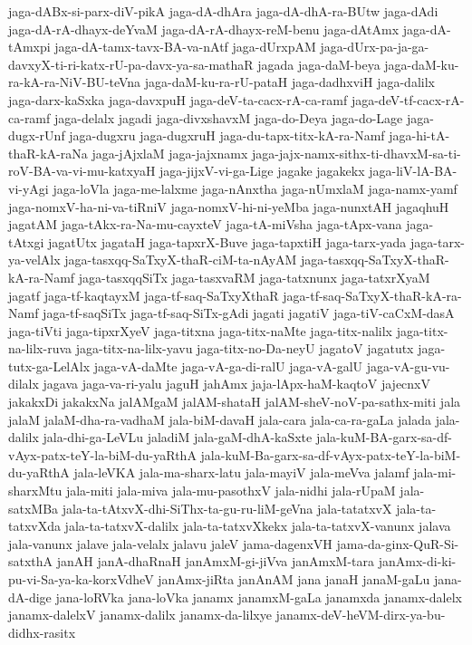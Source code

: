 {jaga-dABx-si-parx-diV-pikA
jaga-dA-dhAra
jaga-dA-dhA-ra-BUtw
jaga-dAdi
jaga-dA-rA-dhayx-deYvaM
jaga-dA-rA-dhayx-reM-benu
jaga-dAtAmx
jaga-dA-tAmxpi
jaga-dA-tamx-tavx-BA-va-nAtf
jaga-dUrxpAM
jaga-dUrx-pa-ja-ga-davxyX-ti-ri-katx-rU-pa-davx-ya-sa-mathaR
jagada
jaga-daM-beya
jaga-daM-ku-ra-kA-ra-NiV-BU-teVna
jaga-daM-ku-ra-rU-pataH
jaga-dadhxviH
jaga-dalilx
jaga-darx-kaSxka
jaga-davxpuH
jaga-deV-ta-cacx-rA-ca-ramf
jaga-deV-tf-cacx-rA-ca-ramf
jaga-delalx
jagadi
jaga-divxshavxM
jaga-do-Deya
jaga-do-Lage
jaga-dugx-rUnf
jaga-dugxru
jaga-dugxruH
jaga-du-tapx-titx-kA-ra-Namf
jaga-hi-tA-thaR-kA-raNa
jaga-jAjxlaM
jaga-jajxnamx
jaga-jajx-namx-sithx-ti-dhavxM-sa-ti-roV-BA-va-vi-mu-katxyaH
jaga-jijxV-vi-ga-Lige
jagake
jagakekx
jaga-liV-lA-BA-vi-yAgi
jaga-loVla
jaga-me-lalxme
jaga-nAnxtha
jaga-nUmxlaM
jaga-namx-yamf
jaga-nomxV-ha-ni-va-tiRniV
jaga-nomxV-hi-ni-yeMba
jaga-nunxtAH
jagaqhuH
jagatAM
jaga-tAkx-ra-Na-mu-cayxteV
jaga-tA-miVsha
jaga-tApx-vana
jaga-tAtxgi
jagatUtx
jagataH
jaga-tapxrX-Buve
jaga-tapxtiH
jaga-tarx-yada
jaga-tarx-ya-velAlx
jaga-tasxqq-SaTxyX-thaR-ciM-ta-nAyAM
jaga-tasxqq-SaTxyX-thaR-kA-ra-Namf
jaga-tasxqqSiTx
jaga-tasxvaRM
jaga-tatxnunx
jaga-tatxrXyaM
jagatf
jaga-tf-kaqtayxM
jaga-tf-saq-SaTxyXthaR
jaga-tf-saq-SaTxyX-thaR-kA-ra-Namf
jaga-tf-saqSiTx
jaga-tf-saq-SiTx-gAdi
jagati
jagatiV
jaga-tiV-caCxM-dasA
jaga-tiVti
jaga-tipxrXyeV
jaga-titxna
jaga-titx-naMte
jaga-titx-nalilx
jaga-titx-na-lilx-ruva
jaga-titx-na-lilx-yavu
jaga-titx-no-Da-neyU
jagatoV
jagatutx
jaga-tutx-ga-LelAlx
jaga-vA-daMte
jaga-vA-ga-di-ralU
jaga-vA-galU
jaga-vA-gu-vu-dilalx
jagava
jaga-va-ri-yalu
jaguH
jahAmx
jaja-lApx-haM-kaqtoV
jajecnxV
jakakxDi
jakakxNa
jalAMgaM
jalAM-shataH
jalAM-sheV-noV-pa-sathx-miti
jala
jalaM
jalaM-dha-ra-vadhaM
jala-biM-davaH
jala-cara
jala-ca-ra-gaLa
jalada
jala-dalilx
jala-dhi-ga-LeVLu
jaladiM
jala-gaM-dhA-kaSxte
jala-kuM-BA-garx-sa-df-vAyx-patx-teY-la-biM-du-yaRthA
jala-kuM-Ba-garx-sa-df-vAyx-patx-teY-la-biM-du-yaRthA
jala-leVKA
jala-ma-sharx-latu
jala-mayiV
jala-meVva
jalamf
jala-mi-sharxMtu
jala-miti
jala-miva
jala-mu-pasothxV
jala-nidhi
jala-rUpaM
jala-satxMBa
jala-ta-tAtxvX-dhi-SiThx-ta-gu-ru-liM-geVna
jala-tatatxvX
jala-ta-tatxvXda
jala-ta-tatxvX-dalilx
jala-ta-tatxvXkekx
jala-ta-tatxvX-vanunx
jalava
jala-vanunx
jalave
jala-velalx
jalavu
jaleV
jama-dagenxVH
jama-da-ginx-QuR-Si-satxthA
janAH
janA-dhaRnaH
janAmxM-gi-jiVva
janAmxM-tara
janAmx-di-ki-pu-vi-Sa-ya-ka-korxVdheV
janAmx-jiRta
janAnAM
jana
janaH
janaM-gaLu
jana-dA-dige
jana-loRVka
jana-loVka
janamx
janamxM-gaLa
janamxda
janamx-dalelx
janamx-dalelxV
janamx-dalilx
janamx-da-lilxye
janamx-deV-heVM-dirx-ya-bu-didhx-rasitx
}
